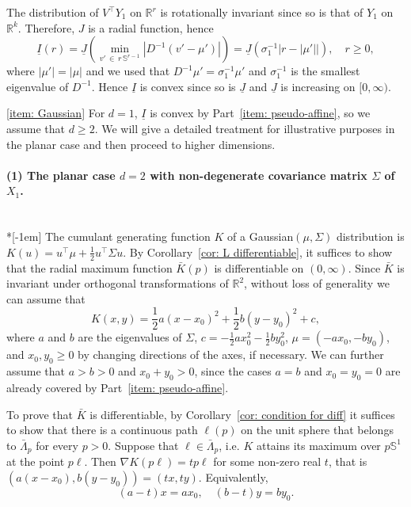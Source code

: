 \documentclass[AHL,Unicode,published]{cedram}
\newcommand{\ubar}[1]{\underline{#1}}
\newcommand{\Rbb}{\mathbb{R}}
\newcommand{\Sbb}{\mathbb{S}}
\begin{document}
\begin{proofc}
The distribution of $V^\top Y_1$ on $\Rbb^r$ is rotationally invariant since so is that of $Y_1$ on $\Rbb^k$. Therefore, $J$ is a radial function, hence
\[
\ubar I (r) = \ubar J \left(\min_{v'\,\in\,r\,\Sbb^{r-1}} \left|D^{-1} (v' - \mu')\right|\right) = \ubar J \left(\sigma_1^{-1}\left|r - |\mu'|\right|\right), \quad r \ge 0,
\]
where $|\mu'|=|\mu|$ and we used that $D^{-1} \mu' = \sigma_1^{-1} \mu'$ and $\sigma_1^{-1}$ is the smallest eigenvalue of $D^{-1}$. Hence $\ubar I$ is convex since so is $\ubar J$ and $\ubar J$ is increasing on $[0, \infty)$.

\eqref{item: Gaussian} For $d=1$, $\ubar I$ is convex by Part~\eqref{item: pseudo-affine}, so we assume that $d \ge 2$. We will give a detailed treatment for illustrative purposes in the planar case and then proceed to higher dimensions.

\paragraph{(1) The planar case $d=2$ with non-degenerate covariance matrix $\Sigma$ of~$X_1$.}\ \\*[-1em]
The cumulant generating function $K$ of a Gaussian$(\mu, \Sigma)$ distribution is\linebreak$K(u)= u^\top \mu + \frac12 u^\top \Sigma u$. By Corollary~\ref{cor: L differentiable}, it suffices to show that the radial maximum function $\bar K(p)$ is differentiable on $(0, \infty)$. Since $\bar K$ is invariant under orthogonal transformations of $\Rbb^2$, without loss of generality we can assume that
\[
K(x,y)=\frac12 a(x-x_0)^2+ \frac12 b(y-y_0)^2 + c,
\]
where $a$ and $b$ are the eigenvalues of $\Sigma$, $c=-\frac12 a x_0^2 - \frac12 b y_0^2$, $\mu = (-ax_0, -by_0)$, and $x_0, y_0 \ge 0$ by changing directions of the axes, if necessary. We can further assume that $a > b>0$ and $x_0 + y_0>0$, since the cases $a=b$ and $x_0=y_0=0$ are already covered by Part~\eqref{item: pseudo-affine}.

To prove that $\bar K$ is differentiable, by Corollary~\ref{cor: condition for diff} it suffices to show that there is a continuous path $\ell(p)$ on the unit sphere that belongs to $\bar \Lambda_p $ for every $p>0$. Suppose that $\ell \in \bar \Lambda_p$, i.e. $K$ attains its maximum over $p \Sbb^1$ at the point $p \ell$. Then $\nabla K(p \ell) = t p\ell$ for some non-zero real $t$, that is $(a(x-x_0),b(y-y_0))= (t x,ty)$. Equivalently,
\begin{equation}\label{eq:hyperbola polynom}
(a-t) x = a x_0, \quad (b-t) y = b y_0.
\end{equation}


\end{proofc}
\end{document}

